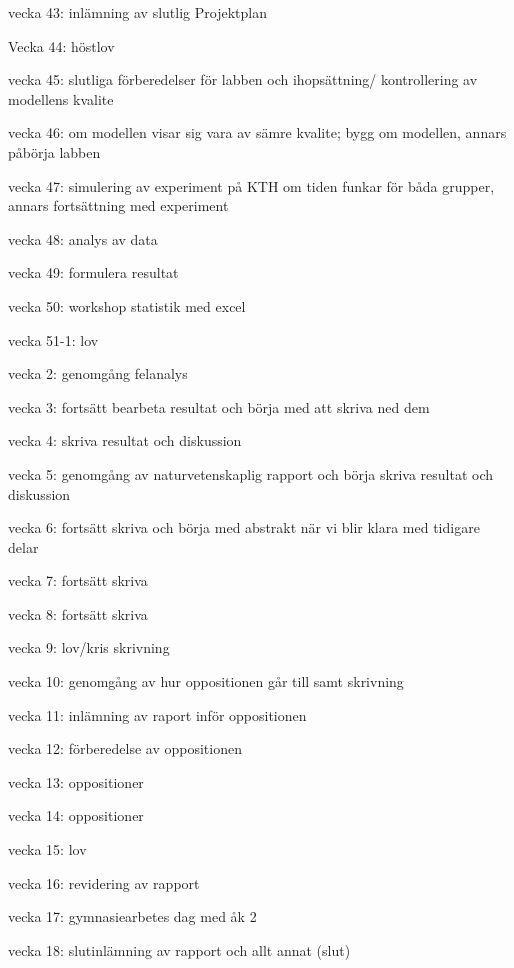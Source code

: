 vecka 43: inlämning av slutlig Projektplan

Vecka 44: höstlov

vecka 45: slutliga förberedelser för labben och ihopsättning/ kontrollering av modellens kvalite

vecka 46: om modellen visar sig vara av sämre kvalite; bygg om modellen, annars påbörja labben

vecka 47: simulering av experiment på KTH om tiden funkar för båda grupper, annars fortsättning med experiment

vecka 48: analys av data

vecka 49: formulera resultat

vecka 50: workshop statistik med excel

vecka 51-1: lov

vecka 2: genomgång felanalys

vecka 3: fortsätt bearbeta resultat och börja med att skriva ned dem

vecka 4: skriva resultat och diskussion

vecka 5: genomgång av naturvetenskaplig rapport och börja skriva resultat och diskussion

vecka 6: fortsätt skriva och börja med abstrakt när vi blir klara med tidigare delar

vecka 7: fortsätt skriva

vecka 8: fortsätt skriva

vecka 9: lov/kris skrivning

vecka 10: genomgång av hur oppositionen går till samt skrivning

vecka 11: inlämning av raport inför oppositionen

vecka 12: förberedelse av oppositionen

vecka 13: oppositioner

vecka 14: oppositioner

vecka 15: lov

vecka 16: revidering av rapport

vecka 17: gymnasiearbetes dag med åk 2

vecka 18: slutinlämning av rapport och allt annat (slut)